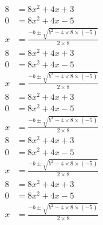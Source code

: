 \documentclass{article}
\begin{document}
\begin{align}
8 &= 8x^2+  4x +  3 \\
0 &= 8x^2 +  4x - 5 \\
x &= \frac{- b \pm \sqrt{b^2- 4\times 8\times \left( - 5 \right) }  }{2\times 8} 
\end{align}
$$\begin{aligned}
8 &= 8x^2+  4x +  3 \\
0 &= 8x^2 +  4x - 5 \\
x &= \frac{- b \pm \sqrt{b^2- 4\times 8\times \left( - 5 \right) }  }{2\times 8} 
\end{aligned}$$
\begin{align}
8 &= 8x^2+  4x +  3 \\
0 &= 8x^2 +  4x - 5 \\
x &= \frac{- b \pm \sqrt{b^2- 4\times 8\times \left( - 5 \right) }  }{2\times 8} 
\end{align}
\begin{align}
8 &= 8x^2+  4x +  3 \\
0 &= 8x^2 +  4x - 5 \\
x &= \frac{- b \pm \sqrt{b^2- 4\times 8\times \left( - 5 \right) }  }{2\times 8} 
\end{align}
$$\begin{aligned} 8 &= 8x^2+ 4x + 3\\
0 &= 8x^2 + 4x - 5\\
x &= \frac{- b \pm \sqrt{b^2- 4\times 8\times \left( - 5 \right) }
}{2\times 8} \end{aligned}$$
\end{document}
